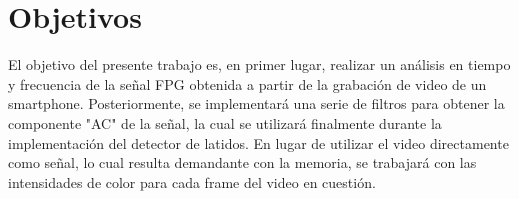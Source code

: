 \section{Objetivos}
\label{sec:obj}

El objetivo del presente trabajo es, en primer lugar, realizar un análisis en tiempo y
frecuencia de la señal FPG obtenida a partir de la grabación de video de un smartphone.
Posteriormente, se implementará una serie de filtros para obtener la componente "AC" de la
señal, la cual se utilizará finalmente durante la implementación del detector de latidos. En
lugar de utilizar el video directamente como señal, lo cual resulta demandante con la
memoria, se trabajará con las intensidades de color para cada frame del video en cuestión.
